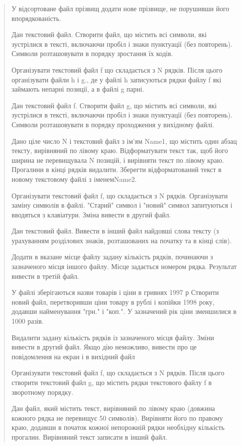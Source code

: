 \documentclass[]{article}
\begin{document}
\begin{quote}
У відсортоване файл прізвищ додати нове прізвище, не порушивши його
впорядкованість.

Дан текстовий файл. Створити файл, що містить всі символи, які
зустрілися в тексті, включаючи пробіл і знаки пунктуації (без
повторень). Символи розташовувати в порядку зростання їх кодів.

Організувати текстовий файл f що складається з N рядків. Після цього
організувати файли h і g., де у файлі h записуються рядки файлу f які
займають непарні позиції, а в файлі g парні.

Дан текстовий файл f. Створити файл g, що містить всі символи, які
зустрілися в тексті, включаючи пробіл і знаки пунктуації (без
повторень). Символи розташовувати в порядку проходження у вихідному
файлі.

Дано ціле число N і текстовий файл з ім'ям Name1, що містить один абзац
тексту, вирівняний по лівому краю. Відформатувати текст так, щоб його
ширина не перевищувала N позицій, і вирівняти текст по лівому краю.
Прогалини в кінці рядків видалити. Зберегти відформатований текст в
новому текстовому файлі з іменемName2.

Організувати текстовий файл f, що складається з N рядків. Організувати
заміну символів в файлі. "Старий" символ і "новий" символ запитуються і
вводяться з клавіатури. Зміна вивести в другий файл.

Дан текстовий файл. Вивести в інший файл найдовші слова тексту (з
урахуванням розділових знаків, розташованих на початку та в кінці слів).

Додати в вказане місце файлу задану кількість рядків, починаючи з
зазначеного місця іншого файлу. Місце задається номером рядка. Результат
вивести в третій файл.

У файлі зберігаються назви товарів і ціни в гривнях 1997 р Створити
новий файл, перетворивши ціни товару в рублі і копійки 1998 року,
додавши найменування "грн." і "коп.". У зазначений рік ціни зменшилися в
1000 разів.

Видалити задану кількість рядків із зазначеного місця файлу. Зміни
вивести в другий файл. Якщо дію неможливо, вивести про це повідомлення
на екран і в вихідний файл

Організувати текстовий файл f, що складається з N рядків. Після цього
створити текстовий файл g, що містить рядки текстового файлу f в
зворотному порядку.

Дан файл, який містить текст, вирівняний по лівому краю (довжина кожного
рядка не перевищує 50 символів). Вирівняти його по правому краю, додавши
в початок кожної непорожній рядки необхідну кількість прогалин.
Вирівняний текст записати в інший файл.


\end{quote}
\end{document}
